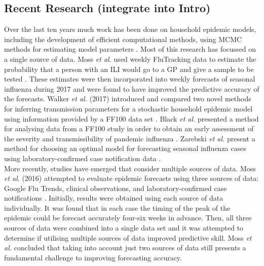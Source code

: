 \subsection{Recent Research (integrate into Intro)}
Over the last ten years much work has been done on household epidemic models, including the development of efficient computational methods, using MCMC methods for estimating model parameters \cite{Ross et al 2010, Black Ross 2013, Geard et al 2013, Black et al 2013, Black Ross 2013, Ristic Dawson 2013, Walker et al 2017}.
Most of this research has focussed on a single source of data. Moss \textit{et al.} used weekly FluTracking data to estimate the probability that a person with an ILI would go to a GP and give a sample to be tested \cite{Moss et al 2019}. These estimates were then incorporated into weekly forecasts of seasonal influenza during 2017 and were found to have improved the predictive accuracy of the forecasts. Walker \textit{et al.} (2017) introduced and compared two novel methods for inferring transmission parameters for a stochastic household epidemic model using information provided by a FF100 data set \cite{Walker et al 2017}. Black \textit{et al.} presented a method for analysing data from a FF100 study in order to obtain an early assessment of the severity and transmissibility of pandemic influenza \cite{Black et al 2017}. Zarebski \textit{et al.} present a method for choosing an optimal model for forecasting seasonal influenza cases using laboratory-confirmed case notification data  \cite{Zarebski et al 2017}.\\
More recently, studies have emerged that consider multiple sources of data.
Moss \textit{et al}. (2016) attempted to evaluate epidemic forecasts using three sources of data: Google Flu Trends, clinical observations, and laboratory-confirmed case notifications \cite{Moss et al 2016}.
Initially, results were obtained using each source of data individually. It was found that in each case the timing of the peak of the epidemic could be forecast accurately four-six weeks in advance. Then, all three sources of data were combined into a single data set and it was attempted to determine if utilising multiple sources of data improved predictive skill. Moss \textit{et al.} concluded that taking into account just two sources of data still presents a fundamental challenge to improving forecasting accuracy.\\
